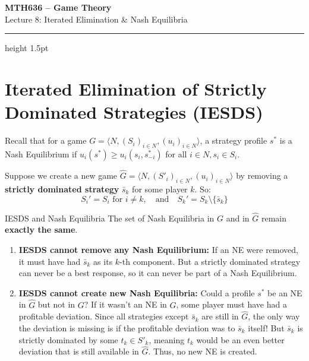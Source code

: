 \documentclass[12pt, a4paper]{article}
\begin{document}
\begin{center}
  {\LARGE\bfseries\sffamily\color{defblue} MTH636 -- Game Theory}\\[6pt]
  {\Large\sffamily Lecture 8: Iterated Elimination \& Nash Equilibria}\\[4pt]
\end{center}
\vspace{0.5cm}
\hrule height 1.5pt
\vspace{0.3cm}

\section{Iterated Elimination of Strictly Dominated Strategies (IESDS)}

Recall that for a game $G = \langle N, (S_i)_{i \in N}, (u_i)_{i \in N} \rangle$, a strategy profile $s^*$ is a Nash Equilibrium if $u_i(s^*) \geq u_i(s_i, s^*_{-i})$ for all $i \in N, s_i \in S_i$.

Suppose we create a new game $\hat{G} = \langle N, (S'_i)_{i \in N}, (u_i)_{i \in N} \rangle$ by removing a \textbf{strictly dominated strategy} $\bar{s}_k$ for some player $k$. So:
\[
  S_i' = S_i \text{ for } i \neq k, \quad \text{and} \quad S_k' = S_k \setminus \{\bar{s}_k\}
\]

\begin{thmbox}{IESDS and Nash Equilibria}
  The set of Nash Equilibria in $G$ and in $\hat{G}$ remain \textbf{exactly the same}.
  \begin{enumerate}
      \item \textbf{IESDS cannot remove any Nash Equilibrium:} If an NE were removed, it must have had $\bar{s}_k$ as its $k$-th component. But a strictly dominated strategy can never be a best response, so it can never be part of a Nash Equilibrium.
      \item \textbf{IESDS cannot create new Nash Equilibria:} Could a profile $s^*$ be an NE in $\hat{G}$ but not in $G$? If it wasn't an NE in $G$, some player must have had a profitable deviation. Since all strategies except $\bar{s}_k$ are still in $\hat{G}$, the only way the deviation is missing is if the profitable deviation was to $\bar{s}_k$ itself! But $\bar{s}_k$ is strictly dominated by some $t_k \in S'_k$, meaning $t_k$ would be an even better deviation that is still available in $\hat{G}$. Thus, no new NE is created.
  \end{enumerate}
\end{thmbox}
\end{document}
